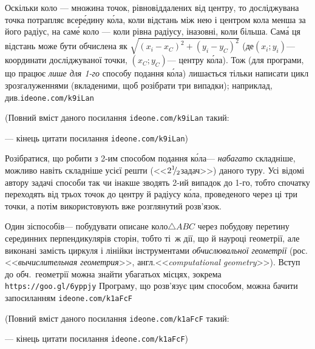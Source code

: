 \documentclass[14pt,a4paper]{extarticle}
\renewcommand{\baselinestretch}{1.3125}
\begin{document}
\Tutorial	Оскільки коло --- множина точок, рівновіддалених від центру, то досліджувана точка потрапляє всер\'{е}дину к\'{о}ла, коли відстань між нею і центром кола менша за його радіус, на сам\'{е} коло --- коли рівна радіусу, і\nolinebreak[3] назовні, коли більша. Сам\'{а} ця відстань може бути обчислена як $\sqrt{(x_i-x_C)^2+(y_i-y_C)^2}$ (де\nolinebreak[3] $(x_i; y_i)$\nolinebreak[3] --- координати досліджуваної точки, $(x_C; y_C)$\nolinebreak[3] --- центру к\'{о}ла). Тож (для програми, що працює \emph{лише для \mbox{1-го}} способу подання к\'{о}ла) лишається тільки написати цикл з\nolinebreak[3] розгалуженнями (вкладеними, щоб розібрати три випадки); наприклад, див.\nolinebreak[3] 
\verb"ideone.com/k9iLan"


{\color{green}\begin{small}

\renewcommand{\baselinestretch}{0.875}

(Повний вміст даного посилання \verb"ideone.com/k9iLan" такий:

--- кінець цитати посилання \verb"ideone.com/k9iLan")

\end{small}}




Розібратися, що робити з \mbox{2-им} способом подання к\'{о}ла\nolinebreak[3] --- \emph{набагато} складніше, можливо навіть складніше усієї решти 
(<<${2\lefteqn{{}^{1}}{}^{\,}\lefteqn{/}{}_{\,\,\,2}}$\nolinebreak[3] задач>>) даного туру. Усі відомі автору задачі способи так чи інакше зводять \mbox{2-ий} випадок до \mbox{1-го}, тобто спочатку переходять від трьох точок до центру й радіусу к\'{о}ла, проведеного через ці три точки, а потім використовують вже розглянутий розв'язок.

Один зі\nolinebreak[3] способів\nolinebreak[3] --- побудувати описане коло\nolinebreak[2] $\triangle{}ABC$ через побудову перетину серединних перпендикулярів сторін, тобто ті~ж дії, що й на\nolinebreak[3] уроці геометрії, але виконані замість циркуля і лінійки інструментами \emph{обчислювальної геометрії} (рос.\nolinebreak[2] <<\emph{вычислительная геометрия}>>, англ.\nolinebreak[2] <<\emph{computational geometry}>>). Вступ до обч.~геометрії можна знайти у\nolinebreak[3] багатьох місцях, зокрема \verb"https://goo.gl/6yppjy"\hspace{0.5em plus 1em} Програму, що розв'язує цим способом, можна бачити за\nolinebreak[3] посиланням 
\verb"ideone.com/k1aFcF"


{\color{green}\begin{small}

\renewcommand{\baselinestretch}{0.875}

(Повний вміст даного посилання \verb"ideone.com/k1aFcF" такий:

--- кінець цитати посилання \verb"ideone.com/k1aFcF")

\end{small}}
\end{document}
